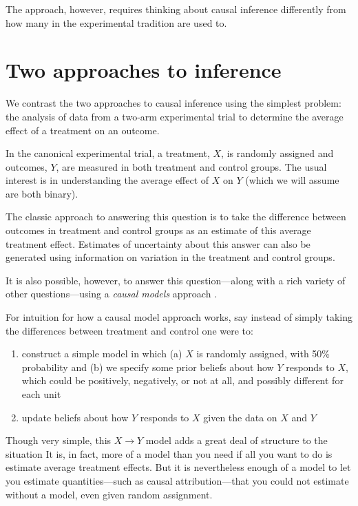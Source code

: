 \documentclass[
  12pt,
]{book}
\begin{document}
The approach, however, requires thinking about causal inference differently from how many in the experimental tradition are used to.

\hypertarget{two-approaches-to-inference}{%
\section{Two approaches to inference}\label{two-approaches-to-inference}}

We contrast the two approaches to causal inference using the simplest problem: the analysis of data from a two-arm experimental trial to determine the average effect of a treatment on an outcome.

In the canonical experimental trial, a treatment, \(X\), is randomly assigned and outcomes, \(Y\), are measured in both treatment and control groups. The usual interest is in understanding the average effect of \(X\) on \(Y\) (which we will assume are both binary).

The classic approach to answering this question is to take the difference between outcomes in treatment and control groups as an estimate of this average treatment effect. Estimates of uncertainty about this answer can also be generated using information on variation in the treatment and control groups.

It is also possible, however, to answer this question---along with a rich variety of other questions---using a \emph{causal models} approach \citep{pearl2009causality}.

For intuition for how a causal model approach works, say instead of simply taking the differences between treatment and control one were to:

\begin{enumerate}
\def\labelenumi{\arabic{enumi}.}
\item
  construct a simple model in which (a) \(X\) is randomly assigned, with 50\% probability and (b) we specify some prior beliefs about how \(Y\) responds to \(X\), which could be positively, negatively, or not at all, and possibly different for each unit
\item
  update beliefs about how \(Y\) responds to \(X\) given the data on \(X\) and \(Y\)
\end{enumerate}

Though very simple, this \(X \rightarrow Y\) model adds a great deal of structure to the situation It is, in fact, more of a model than you need if all you want to do is estimate average treatment effects. But it is nevertheless enough of a model to let you estimate quantities---such as causal attribution---that you could not estimate without a model, even given random assignment.
\end{document}
